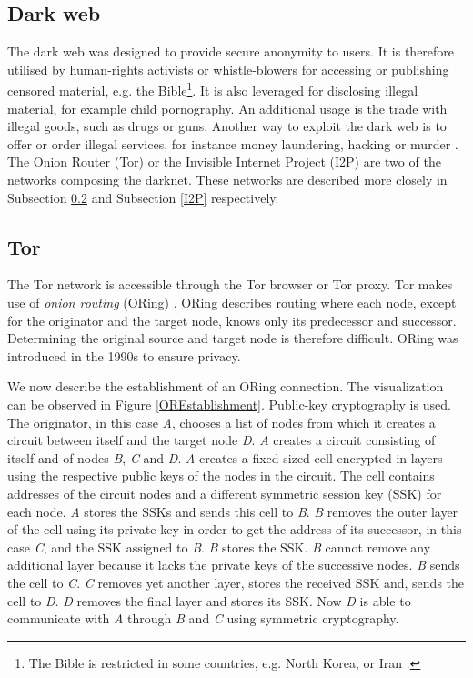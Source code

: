 \subsection{Dark web} \label{darkWeb}
The dark web was designed to provide secure anonymity to users. It is therefore utilised by human-rights activists or whistle-blowers for accessing or publishing censored material, e.g. the Bible\footnote{The Bible is restricted in some countries, e.g. North Korea, or Iran \cite{illegalBible}.}. It is also leveraged for disclosing illegal material, for example child pornography. An additional usage is the trade with illegal goods, such as drugs or guns. Another way to exploit the dark web is to offer or order illegal services, for instance money laundering, hacking or murder \cite{theDarkNet}. The Onion Router (Tor) or the Invisible Internet Project (I2P) are two of the networks composing the darknet. These networks are described more closely in Subsection \ref{tor} and Subsection \ref{I2P} respectively.

\subsection{Tor} \label{tor}
The Tor network \cite{torIntro} is accessible through the Tor browser or Tor proxy. Tor makes use of \textit{onion routing} (ORing) \cite{onionRouting}. ORing describes routing where each node, except for the originator and the target node, knows only its predecessor and successor. Determining the original source and target node is therefore difficult. ORing was introduced in the 1990s to ensure privacy. 

We now describe the establishment of an ORing connection. The visualization can be observed in Figure \ref{OREstablishment}. Public-key cryptography is used. The originator, in this case \textit{A}, chooses a list of nodes from which it creates a circuit between itself and the target node \textit{D}. \textit{A} creates a circuit consisting of itself and of nodes \textit{B}, \textit{C} and \textit{D}. \textit{A} creates a fixed-sized cell encrypted in layers using the respective public keys of the nodes in the circuit. The cell contains addresses of the circuit nodes and a different symmetric session key (SSK) for each node. \textit{A} stores the SSKs and sends this cell to \textit{B}. \textit{B} removes the outer layer of the cell using its private key in order to get the address of its successor, in this case \textit{C}, and the SSK assigned to \textit{B}. \textit{B} stores the SSK. \textit{B} cannot remove any additional layer because it lacks the private keys of the successive nodes. \textit{B} sends the cell to \textit{C}. \textit{C} removes yet another layer, stores the received SSK and, sends the cell to \textit{D}. \textit{D} removes the final layer and stores its SSK. Now \textit{D} is able to communicate with \textit{A} through \textit{B} and \textit{C} using symmetric cryptography. 

